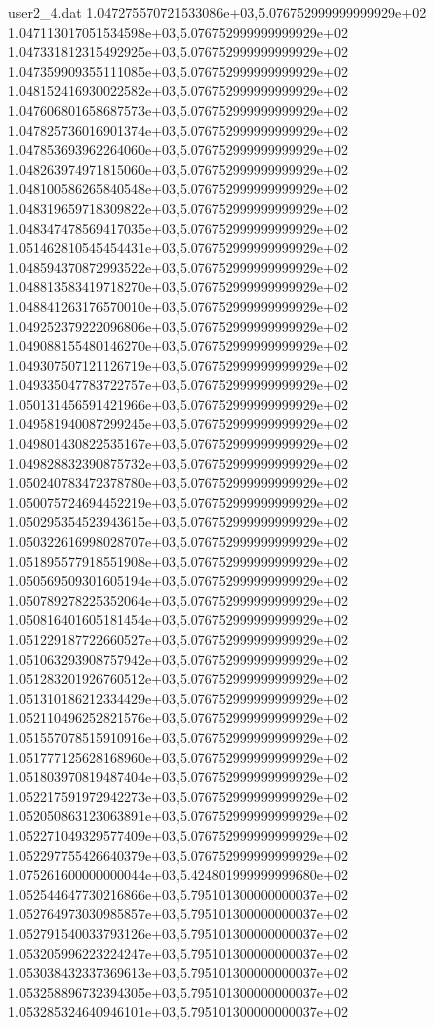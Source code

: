 \begin{filecontents}{user2_4.dat}
1.047275570721533086e+03,5.076752999999999929e+02
1.047113017051534598e+03,5.076752999999999929e+02
1.047331812315492925e+03,5.076752999999999929e+02
1.047359909355111085e+03,5.076752999999999929e+02
1.048152416930022582e+03,5.076752999999999929e+02
1.047606801658687573e+03,5.076752999999999929e+02
1.047825736016901374e+03,5.076752999999999929e+02
1.047853693962264060e+03,5.076752999999999929e+02
1.048263974971815060e+03,5.076752999999999929e+02
1.048100586265840548e+03,5.076752999999999929e+02
1.048319659718309822e+03,5.076752999999999929e+02
1.048347478569417035e+03,5.076752999999999929e+02
1.051462810545454431e+03,5.076752999999999929e+02
1.048594370872993522e+03,5.076752999999999929e+02
1.048813583419718270e+03,5.076752999999999929e+02
1.048841263176570010e+03,5.076752999999999929e+02
1.049252379222096806e+03,5.076752999999999929e+02
1.049088155480146270e+03,5.076752999999999929e+02
1.049307507121126719e+03,5.076752999999999929e+02
1.049335047783722757e+03,5.076752999999999929e+02
1.050131456591421966e+03,5.076752999999999929e+02
1.049581940087299245e+03,5.076752999999999929e+02
1.049801430822535167e+03,5.076752999999999929e+02
1.049828832390875732e+03,5.076752999999999929e+02
1.050240783472378780e+03,5.076752999999999929e+02
1.050075724694452219e+03,5.076752999999999929e+02
1.050295354523943615e+03,5.076752999999999929e+02
1.050322616998028707e+03,5.076752999999999929e+02
1.051895577918551908e+03,5.076752999999999929e+02
1.050569509301605194e+03,5.076752999999999929e+02
1.050789278225352064e+03,5.076752999999999929e+02
1.050816401605181454e+03,5.076752999999999929e+02
1.051229187722660527e+03,5.076752999999999929e+02
1.051063293908757942e+03,5.076752999999999929e+02
1.051283201926760512e+03,5.076752999999999929e+02
1.051310186212334429e+03,5.076752999999999929e+02
1.052110496252821576e+03,5.076752999999999929e+02
1.051557078515910916e+03,5.076752999999999929e+02
1.051777125628168960e+03,5.076752999999999929e+02
1.051803970819487404e+03,5.076752999999999929e+02
1.052217591972942273e+03,5.076752999999999929e+02
1.052050863123063891e+03,5.076752999999999929e+02
1.052271049329577409e+03,5.076752999999999929e+02
1.052297755426640379e+03,5.076752999999999929e+02
1.075261600000000044e+03,5.424801999999999680e+02
1.052544647730216866e+03,5.795101300000000037e+02
1.052764973030985857e+03,5.795101300000000037e+02
1.052791540033793126e+03,5.795101300000000037e+02
1.053205996223224247e+03,5.795101300000000037e+02
1.053038432337369613e+03,5.795101300000000037e+02
1.053258896732394305e+03,5.795101300000000037e+02
1.053285324640946101e+03,5.795101300000000037e+02

\end{filecontents}
